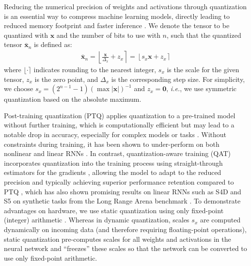 Reducing the numerical precision of weights and activations through quantization is an essential way to compress machine learning models, directly leading to reduced memory footprint and faster inference \cite{gholami_survey_2021}. We denote the tensor to be quantized with $\mathbf{x}$ and the number of bits to use with $n$, such that the quantized tensor $\mathbf{\bar x}_n$ is defined as:
\begin{align}
    \mathbf{\bar{x}}_n =
    \left\lfloor \frac{\mathbf{x}}{\Delta_x} + z_x \right\rceil = \left\lfloor s_x \mathbf{x} + z_x \right\rceil
\end{align}
where $\lfloor \cdot \rceil$ indicates rounding to the nearest integer, $s_x$ is the scale for the given tensor, $z_x$ is the zero point, and $\Delta_x$ is the corresponding step size. For simplicity, we choose $s_x = (2^{n-1}-1) (\max |\mathbf{x}|)^{-1}$ and $z_x = \mathbf{0}$, \textit{i.e.}, we use symmetric quantization based on the absolute maximum.

Post-training quantization (PTQ) applies quantization to a pre-trained model without further training, which is computationally efficient but may lead to a notable drop in accuracy, especially for complex models or tasks \cite{gholami_survey_2021}. Without constraints during training, it has been shown to under-perform on both nonlinear \cite{wu_googles_2016} and linear RNNs \cite{abreu2024q}.
In contrast, quantization-aware training (QAT) incorporates quantization into the training process using straight-through estimators for the gradients \cite{DBLP:journals/corr/BengioLC13}, allowing the model to adapt to the reduced precision and typically achieving superior performance retention compared to PTQ \cite{hubara_quantized_2018}, which has also shown promising results on linear RNNs such as S4D \cite{meyer2024diagonal} and S5 \cite{abreu2024q} on synthetic tasks from the Long Range Arena benchmark \cite{DBLP:conf/iclr/Tay0ASBPRYRM21}.
%
To demonstrate advantages on hardware, we use static quantization \cite{gholami_survey_2021} using only fixed-point (integer) arithmetic \cite{wu_integer_2020}. Whereas in dynamic quantization, scales $s_x$ are computed dynamically on incoming data (and therefore requiring floating-point operations), static quantization pre-computes scales for all weights and activations in the neural network and ``freezes'' these scales so that the network can be converted to use only fixed-point arithmetic.


